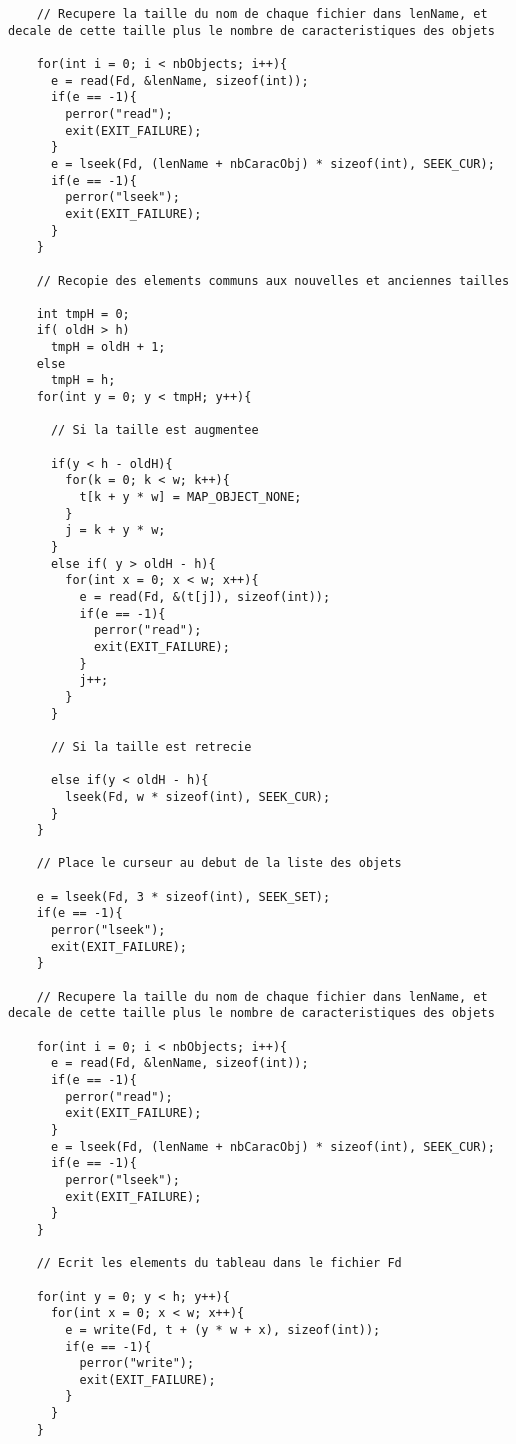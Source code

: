 \documentclass{report}
\begin{document}
\begin{lstlisting}
    // Recupere la taille du nom de chaque fichier dans lenName, et decale de cette taille plus le nombre de caracteristiques des objets

    for(int i = 0; i < nbObjects; i++){
	  e = read(Fd, &lenName, sizeof(int));
	  if(e == -1){
	    perror("read");
	    exit(EXIT_FAILURE);
	  }
	  e = lseek(Fd, (lenName + nbCaracObj) * sizeof(int), SEEK_CUR);
	  if(e == -1){
	    perror("lseek");
	    exit(EXIT_FAILURE);
	  }
	}
      
    // Recopie des elements communs aux nouvelles et anciennes tailles
      
    int tmpH = 0;
    if( oldH > h)
	  tmpH = oldH + 1;
    else
	  tmpH = h; 
    for(int y = 0; y < tmpH; y++){
	  
      // Si la taille est augmentee
	  
      if(y < h - oldH){
        for(k = 0; k < w; k++){
          t[k + y * w] = MAP_OBJECT_NONE;
        }
        j = k + y * w;
      }
      else if( y > oldH - h){
        for(int x = 0; x < w; x++){
          e = read(Fd, &(t[j]), sizeof(int));
          if(e == -1){
            perror("read");
            exit(EXIT_FAILURE);
          }
          j++;
        }
      }
	  
      // Si la taille est retrecie
	  
      else if(y < oldH - h){
	    lseek(Fd, w * sizeof(int), SEEK_CUR);
	  }
	}
    
    // Place le curseur au debut de la liste des objets
    
    e = lseek(Fd, 3 * sizeof(int), SEEK_SET);
    if(e == -1){
	  perror("lseek");
	  exit(EXIT_FAILURE);
	}
    
    // Recupere la taille du nom de chaque fichier dans lenName, et decale de cette taille plus le nombre de caracteristiques des objets
    
    for(int i = 0; i < nbObjects; i++){
	  e = read(Fd, &lenName, sizeof(int));
	  if(e == -1){
	    perror("read");
	    exit(EXIT_FAILURE);
	  }
	  e = lseek(Fd, (lenName + nbCaracObj) * sizeof(int), SEEK_CUR);
	  if(e == -1){
	    perror("lseek");
	    exit(EXIT_FAILURE);
	  }
	}
    
    // Ecrit les elements du tableau dans le fichier Fd
    
    for(int y = 0; y < h; y++){
      for(int x = 0; x < w; x++){
        e = write(Fd, t + (y * w + x), sizeof(int));
        if(e == -1){
          perror("write");
          exit(EXIT_FAILURE);
        }
      }
    }
    

\end{lstlisting}
\end{document}
